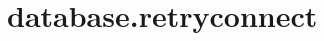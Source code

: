 \section{database.retryconnect}
\label{configuration:DatabaseRetryconnect}
\AvailableInJavaOnly{\TODO}